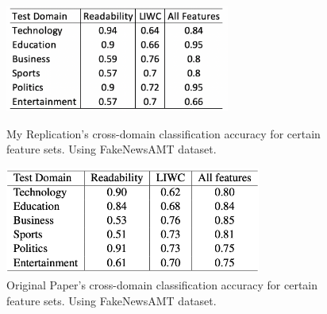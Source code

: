 \documentclass{article}
\begin{document}
\begin{figure}[]
  \centering
  \begin{minipage}[b]{0.4\textwidth}
    \includegraphics[width=\textwidth, height=3.5cm]{Results_For_Paper/Table7Me.png}
    \caption{My Replication's cross-domain classification accuracy for certain feature sets. Using FakeNewsAMT dataset.}
  \end{minipage}
  \hfill
  \begin{minipage}[b]{0.4\textwidth}
    \includegraphics[width=\textwidth, height=3.5cm]{Results_For_Paper/Table7Real.png}
    \caption{Original Paper's cross-domain classification accuracy for certain feature sets. Using FakeNewsAMT dataset.}
  \end{minipage}
\end{figure}
\end{document}
